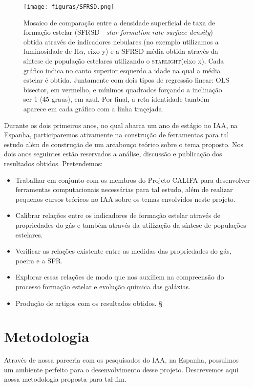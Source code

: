 \documentclass[a4paper,12pt]{article}
\def\starlight{\textsc{starlight}\xspace}      %
\begin{document}
\begin{figure}
	\begin{center}
    \texttt{[image: figuras/SFRSD.png]}
    \caption[]{Mosaico de comparação entre a densidade superficial de taxa de formação estelar
    (SFRSD - {\em star formation rate surface density}) obtida através de indicadores nebulares (no
    exemplo utilizamos a luminosidade de H$\alpha$, eixo y) e a SFRSD média obtida através da
    síntese de população estelares utilizando o \starlight (eixo x). Cada gráfico indica no canto
    superior esquerdo a idade na qual a média estelar é obtida. Juntamente com dois tipos de
    regressão linear: OLS bisector, em vermelho, e mínimos quadrados forçando a inclinação ser
    1 (45 graus), em azul. Por final, a reta identidade também aparece em cada gráfico com a linha
    traçejada.}
    \label{fig:SFRSDgasXSFRSDstar}
    \end{center}
\end{figure}

Durante os dois primeiros anos, no qual abarca um ano de estágio no IAA, na Espanha, participaremos
ativamente na construção de ferramentas para tal estudo além de construção de um arcabouço teórico
sobre o tema proposto. Nos dois anos seguintes estão reservados a análise, discussão e publicação
dos resultados obtidos. Pretendemos:

\begin{itemize}
  \item Trabalhar em conjunto com os membros do Projeto CALIFA para desenvolver ferramentas
  computacionais necessárias para tal estudo, além de realizar pequenos cursos teóricos no IAA sobre
  os temas envolvidos neste projeto.
  \item Calibrar relações entre os indicadores de formação estelar através de propriedades do gás e
  também através da utilização da síntese de populações estelares.
  \item Verificar as relações existente entre as medidas das propriedades do gás, poeira e a SFR.
  \item Explorar essas relações de modo que nos auxiliem na compreensão do processo formação estelar
  e evolução química das galáxias.
  \item Produção de artigos com os resultados obtidos.
§\end{itemize}

\section{Metodologia}
\vspace{0.3cm}
Através de nossa parceria com os pesquisados do IAA, na Espanha, possuimos um ambiente perfeito para
o desenvolvimento desse projeto. Descrevemos aqui nossa metodologia proposta para tal fim.
\end{document}
